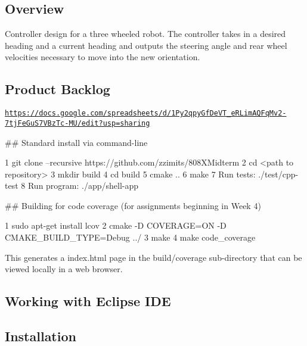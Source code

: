 \href{https://travis-ci.com/zzimits/808XMidterm}{\tt } \href{https://coveralls.io/github/zzimits/808XMidterm?branch=master}{\tt } \subsection*{\href{https://opensource.org/licenses/MIT}{\tt } }

\subsection*{Overview}

Controller design for a three wheeled robot. The controller takes in a desired heading and a current heading and outputs the steering angle and rear wheel velocities necessary to move into the new orientation.

\subsection*{Product Backlog}

\href{https://docs.google.com/spreadsheets/d/1Py2qpyGfDeVT_eRLimAQFqMv2-7tjFeGuS7VBzTc-MU/edit?usp=sharing}{\tt https\+://docs.\+google.\+com/spreadsheets/d/1\+Py2qpy\+Gf\+De\+V\+T\+\_\+e\+R\+Lim\+A\+Q\+Fq\+Mv2-\/7tj\+Fe\+Gu\+S7\+V\+Bz\+Tc-\/\+M\+U/edit?usp=sharing}

\#\# Standard install via command-\/line 
\begin{DoxyCode}
1 git clone --recursive https://github.com/zzimits/808XMidterm
2 cd <path to repository>
3 mkdir build
4 cd build
5 cmake ..
6 make
7 Run tests: ./test/cpp-test
8 Run program: ./app/shell-app
\end{DoxyCode}


\#\# Building for code coverage (for assignments beginning in Week 4) 
\begin{DoxyCode}
1 sudo apt-get install lcov
2 cmake -D COVERAGE=ON -D CMAKE\_BUILD\_TYPE=Debug ../
3 make
4 make code\_coverage
\end{DoxyCode}
 This generates a index.\+html page in the build/coverage sub-\/directory that can be viewed locally in a web browser.

\subsection*{Working with Eclipse I\+DE}

\subsection*{Installation}


